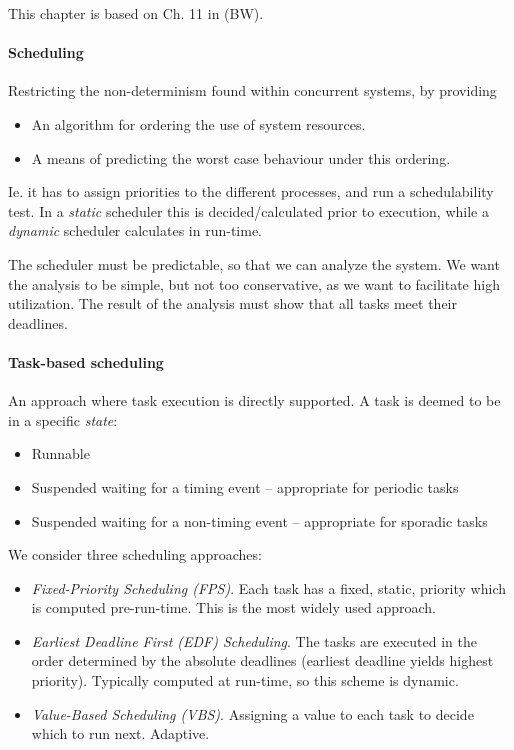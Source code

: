 
This chapter is based on Ch. 11 in (BW).

\sepline

\paragraph{Scheduling} Restricting the non-determinism found within concurrent systems, by providing
\begin{itemize}[nolistsep,noitemsep]
  \item An algorithm for ordering the use of system resources.
  \item A means of predicting the worst case behaviour under this ordering.
\end{itemize}
Ie. it has to assign priorities to the different processes, and run a schedulability test. In a \textit{static} scheduler this is decided/calculated prior to execution, while a \textit{dynamic} scheduler calculates in run-time.

The scheduler must be predictable, so that we can analyze the system. We want the analysis to be simple, but not too conservative, as we want to facilitate high utilization. The result of the analysis must show that all tasks meet their deadlines.

\paragraph{Task-based scheduling} An approach where task execution is directly supported. A task is deemed to be in a specific \textit{state}:
\begin{itemize}[nolistsep,noitemsep]
  \item Runnable
  \item Suspended waiting for a timing event -- appropriate for periodic tasks
  \item Suspended waiting for a non-timing event -- appropriate for sporadic tasks
\end{itemize}
We consider three scheduling approaches:
\begin{itemize}[nolistsep,noitemsep]
  \item \textit{Fixed-Priority Scheduling (FPS)}. Each task has a fixed, static, priority which is computed pre-run-time. This is the most widely used approach.
  \item \textit{Earliest Deadline First (EDF) Scheduling}. The tasks are executed in the order determined by the absolute deadlines (earliest deadline yields highest priority). Typically computed at run-time, so this scheme is dynamic.
  \item \textit{Value-Based Scheduling (VBS)}. Assigning a value to each task to decide which to run next. Adaptive.
\end{itemize}

